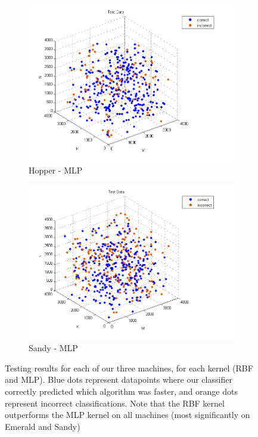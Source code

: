 \begin{figure}[t]
\begin{subfigure}[t]{0.33\textwidth}
            \includegraphics[width=\textwidth]{figures/hopper_test_mlp.png}
            \caption{Hopper - MLP}
            \label{f:classify_mlp_hopper}
        \end{subfigure}
        \begin{subfigure}[t]{0.33\textwidth}
            \includegraphics[width=\textwidth]{figures/sandy_test_mlp.png}
            \caption{Sandy - MLP}
            \label{f:classify_mlp_sandy}
        \end{subfigure}

        \caption{Testing results for each of our three machines, for each kernel (RBF and MLP). Blue dots represent datapoints where our classifier correctly predicted which algorithm was faster, and orange dots represent incorrect classifications. Note that the RBF kernel outperforms the MLP kernel on all machines (most significantly on Emerald and Sandy)}
    \label{fig:classifying}
\end{figure}

